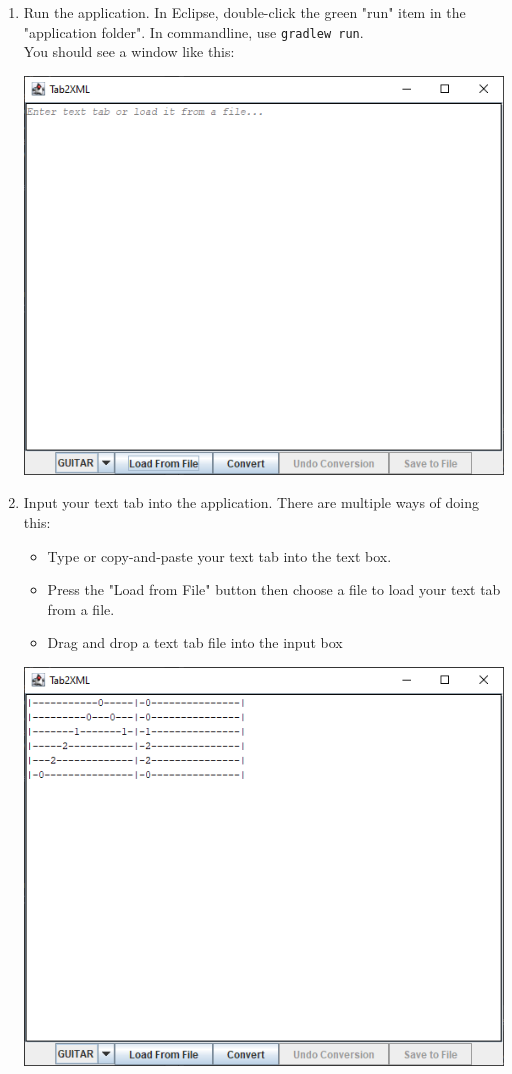 \documentclass[11pt]{article}
\begin{document}
\begin{enumerate}
\item Run the application.  In Eclipse, double-click the green "run" item in the "application folder".  In commandline, use \texttt{gradlew run}.\\
You should see a window like this:
\begin{center}
\includegraphics[width=.9\linewidth]{../screendump-main-interface.png}
\end{center}
\item Input your text tab into the application.  There are multiple ways of doing this:
\begin{itemize}
\item Type or copy-and-paste your text tab into the text box.
\item Press the "Load from File" button then choose a file to load your text tab from a file.
\item Drag and drop a text tab file into the input box
\end{itemize}
\begin{center}
\includegraphics[width=.9\linewidth]{../screendump-text-tab.png}

\end{center}
\end{enumerate}
\end{document}
